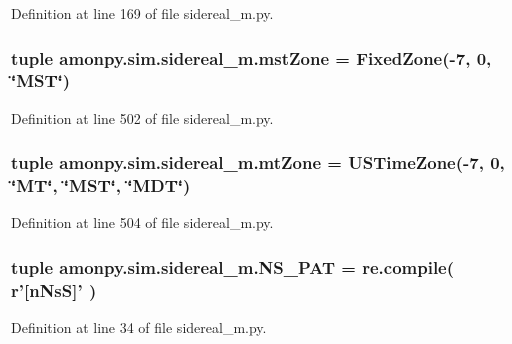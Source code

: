 Definition at line 169 of file sidereal\-\_\-m.\-py.

\hypertarget{namespaceamonpy_1_1sim_1_1sidereal__m_a4874e931a2ffa48d89e1df2cc9ea2743}{
\subsubsection[{mst\-Zone}]{\setlength{\rightskip}{0pt plus 5cm}tuple amonpy.\-sim.\-sidereal\-\_\-m.\-mst\-Zone = {\bf Fixed\-Zone}(-\/7, 0, \char`\"{}M\-S\-T\char`\"{})}}\label{namespaceamonpy_1_1sim_1_1sidereal__m_a4874e931a2ffa48d89e1df2cc9ea2743}


Definition at line 502 of file sidereal\-\_\-m.\-py.

\hypertarget{namespaceamonpy_1_1sim_1_1sidereal__m_a80909105a843798d6a1210feddc35a4d}{
\subsubsection[{mt\-Zone}]{\setlength{\rightskip}{0pt plus 5cm}tuple amonpy.\-sim.\-sidereal\-\_\-m.\-mt\-Zone = {\bf U\-S\-Time\-Zone}(-\/7, 0, \char`\"{}M\-T\char`\"{}, \char`\"{}M\-S\-T\char`\"{}, \char`\"{}M\-D\-T\char`\"{})}}\label{namespaceamonpy_1_1sim_1_1sidereal__m_a80909105a843798d6a1210feddc35a4d}


Definition at line 504 of file sidereal\-\_\-m.\-py.

\hypertarget{namespaceamonpy_1_1sim_1_1sidereal__m_a23fa30b390eca6ffe322d1bfad9f9de9}{
\subsubsection[{N\-S\-\_\-\-P\-A\-T}]{\setlength{\rightskip}{0pt plus 5cm}tuple amonpy.\-sim.\-sidereal\-\_\-m.\-N\-S\-\_\-\-P\-A\-T = re.\-compile( r'\mbox{[}n\-Ns\-S\mbox{]}' )}}\label{namespaceamonpy_1_1sim_1_1sidereal__m_a23fa30b390eca6ffe322d1bfad9f9de9}


Definition at line 34 of file sidereal\-\_\-m.\-py.

